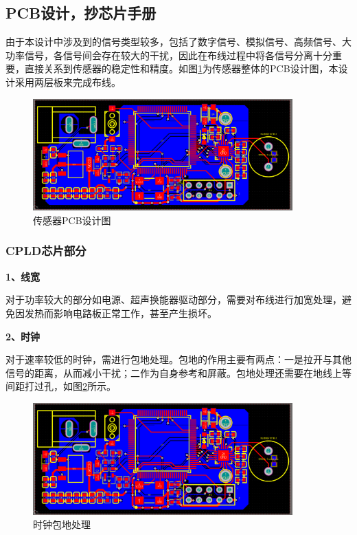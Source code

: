     \subsection{PCB设计，抄芯片手册}
    由于本设计中涉及到的信号类型较多，包括了数字信号、模拟信号、高频信号、大功率信号，各信号间会存在较大的干扰，因此在布线过程中将各信号分离十分重要，直接关系到传感器的稳定性和精度。如图\ref{传感器PCB设计图}为传感器整体的PCB设计图，本设计采用两层板来完成布线。
      \begin{figure}[H]
        \centering
        \includegraphics[width=10cm]{figure/overall pcb}
        \songti{}\caption{传感器PCB设计图}
        \label{传感器PCB设计图}
    \end{figure}
    
    \subsubsection{CPLD芯片部分}
    \noindent
    \textbf{1、线宽}\par
    对于功率较大的部分如电源、超声换能器驱动部分，需要对布线进行加宽处理，避免因发热而影响电路板正常工作，甚至产生损坏。\par
    \noindent
    \textbf{2、时钟}\par
    对于速率较低的时钟，需进行包地处理。包地的作用主要有两点：一是拉开与其他信号的距离，从而减小干扰；二作为自身参考和屏蔽。包地处理还需要在地线上等间距打过孔，如图\ref{时钟包地处理}所示。
     \begin{figure}[H]
        \centering
        \includegraphics[width=10cm]{figure/overall pcb}
        \songti{}\caption{时钟包地处理}
        \label{时钟包地处理}
    \end{figure}
    
